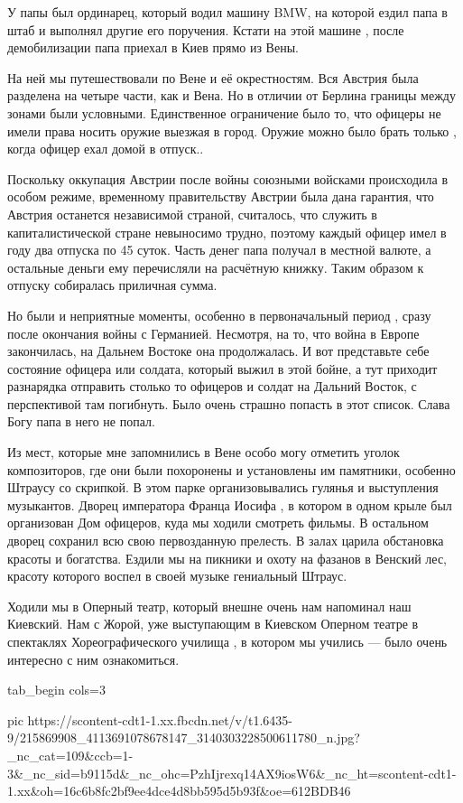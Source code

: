 У папы был ординарец, который водил машину BMW, на которой ездил папа в штаб и
выполнял другие его поручения. Кстати на этой машине , после демобилизации папа
приехал в Киев прямо из Вены.

На ней мы путешествовали по Вене и её окрестностям.  Вся Австрия была разделена
на четыре части, как и Вена. Но в отличии от Берлина границы между зонами были
условными. Единственное ограничение было то,  что офицеры не имели права носить
оружие выезжая в город. Оружие можно было брать только , когда офицер ехал
домой в отпуск.. 

Поскольку оккупация Австрии  после войны  союзными войсками происходила в
особом режиме, временному правительству Австрии была дана гарантия, что Австрия
останется независимой страной, считалось, что служить в капиталистической
стране невыносимо трудно, поэтому каждый офицер имел в году два отпуска по 45
суток. Часть денег папа получал в местной валюте, а остальные деньги ему
перечисляли на расчётную книжку. Таким образом к отпуску собиралась приличная
сумма. 

Но были и неприятные моменты, особенно в первоначальный период , сразу после
окончания войны с Германией. Несмотря, на то, что война в Европе закончилась,
на Дальнем Востоке  она продолжалась. И вот представьте себе состояние
офицера или солдата, который выжил в этой бойне, а тут приходит разнарядка
отправить столько то офицеров и солдат на Дальний Восток, с перспективой там
погибнуть. Было очень страшно попасть в этот список. Слава Богу папа в него не
попал.

Из мест, которые мне запомнились в Вене особо могу отметить уголок
композиторов, где они  были похоронены и установлены  им памятники, особенно
Штраусу со скрипкой. В этом парке организовывались гулянья и выступления
музыкантов.  Дворец императора Франца Иосифа , в котором в одном крыле был
организован Дом офицеров, куда мы ходили смотреть фильмы.   В остальном дворец
сохранил всю свою первозданную прелесть. В залах царила обстановка красоты и
богатства.  Ездили мы на пикники и охоту на фазанов в Венский лес, красоту
которого воспел в своей музыке гениальный Штраус. 

Ходили мы  в Оперный театр, который внешне очень нам напоминал наш Киевский.
Нам с Жорой, уже  выступающим в Киевском  Оперном театре в спектаклях
Хореографического училища , в котором мы учились — было очень интересно с ним
ознакомиться.  

\ifcmt
  tab_begin cols=3

     pic https://scontent-cdt1-1.xx.fbcdn.net/v/t1.6435-9/215869908_4113691078678147_3140303228500611780_n.jpg?_nc_cat=109&ccb=1-3&_nc_sid=b9115d&_nc_ohc=PzhIjrexq14AX9iosW6&_nc_ht=scontent-cdt1-1.xx&oh=16c6b8fc2bf9ee4dce4d8bb595d5b93f&oe=612BDB46

